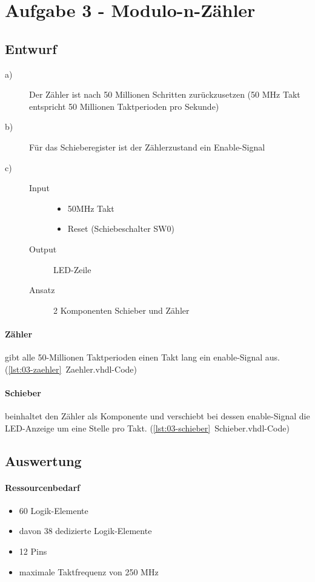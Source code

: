 \section{Aufgabe 3 - Modulo-n-Zähler}
\subsection{Entwurf}
\begin{description}
\item[a)] Der Zähler ist nach 50 Millionen Schritten zurückzusetzen (50 MHz Takt entspricht 50 Millionen Taktperioden pro Sekunde)
\item[b)] Für das Schieberegister ist der Zählerzustand ein Enable-Signal
\item[c)] 
	\begin{description}
	\item[Input] 
		\begin{itemize}
			\item 50MHz Takt
			\item Reset (Schiebeschalter SW0)
		\end{itemize}
	\item[Output] LED-Zeile
	\item[Ansatz] 2 Komponenten Schieber und Zähler 
	\end{description}	
\end{description}
\paragraph{Zähler} gibt alle 50-Millionen Taktperioden einen Takt lang ein enable-Signal aus. 
(\ref{lst:03-zaehler}~Zaehler.vhdl-Code)
\paragraph{Schieber} beinhaltet den Zähler als Komponente und verschiebt bei dessen enable-Signal die LED-Anzeige um eine Stelle pro Takt. (\ref{lst:03-schieber}~Schieber.vhdl-Code)

\subsection{Auswertung}
\paragraph{Ressourcenbedarf}
\begin{itemize} 
\item 60 Logik-Elemente
\item davon 38 dedizierte Logik-Elemente
\item 12 Pins 
\item maximale Taktfrequenz von 250 MHz
\end{itemize}
